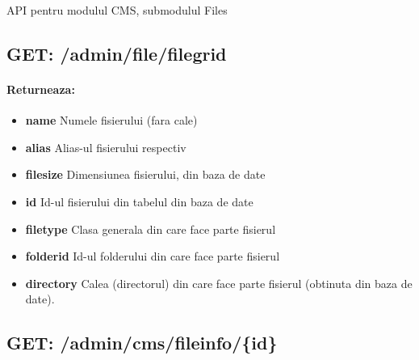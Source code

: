 API pentru modulul CMS, submodulul Files \subsection*{GET: /admin/file/filegrid}

\paragraph{Returneaza:}
\begin{itemize}
\item \textbf{name}
 Numele fisierului (fara cale)
\item \textbf{alias}
 Alias-ul fisierului respectiv
\item \textbf{filesize}
 Dimensiunea fisierului, din baza de date
\item \textbf{id}
 Id-ul fisierului din tabelul din baza de date
\item \textbf{filetype}
 Clasa generala din care face parte fisierul
\item \textbf{folderid}
 Id-ul folderului din care face parte fisierul
\item \textbf{directory}
 Calea (directorul) din care face parte fisierul (obtinuta din baza de date).
 \end{itemize}
 \subsection*{GET: /admin/cms/fileinfo/\{id\}}

